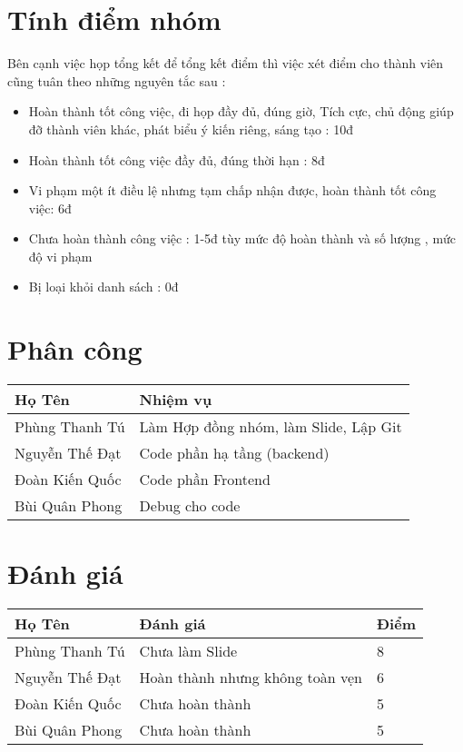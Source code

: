 \documentclass[12pt]{article}
\begin{document}
\begin{titlepage}
\section{Tính điểm nhóm}
Bên cạnh việc họp tổng kết để tổng kết điểm thì việc xét điểm cho thành viên cũng tuân theo những nguyên tắc sau :
\begin{itemize}
    \item Hoàn thành tốt công việc, đi họp đầy đủ, đúng giờ, Tích cực, chủ động giúp đỡ thành viên khác, phát biểu ý kiến riêng, sáng tạo : 10đ
    \item Hoàn thành tốt công việc đầy đủ, đúng thời hạn : 8đ
    \item Vi phạm một ít điều lệ nhưng tạm chấp nhận được, hoàn thành tốt công việc: 6đ
    \item Chưa hoàn thành công việc : 1-5đ tùy mức độ hoàn thành và số lượng , mức độ vi phạm
    \item Bị loại khỏi danh sách : 0đ
    
\end{itemize}

\section{Phân công}
\begin{tabular}{|l|l|} \hline
  Họ Tên   & Nhiệm vụ \\ \hline
    Phùng Thanh Tú  & Làm Hợp đồng nhóm, làm Slide, Lập Git\\ \hline
    Nguyễn Thế Đạt & Code phần hạ tầng (backend) \\ \hline
    Đoàn Kiến Quốc  & Code phần Frontend \\ \hline
    Bùi Quân Phong  & Debug cho code \\ \hline
\end{tabular}

\section{Đánh giá}
\begin{tabular}{|l|l|l|} \hline
  Họ Tên   & Đánh giá & Điểm \\ \hline
    Phùng Thanh Tú  & Chưa làm Slide & 8\\ \hline
    Nguyễn Thế Đạt & Hoàn thành nhưng không toàn vẹn & 6 \\ \hline
    Đoàn Kiến Quốc  & Chưa hoàn thành & 5\\ \hline
    Bùi Quân Phong  & Chưa hoàn thành & 5\\ \hline
\end{tabular}


 \end{titlepage}
\end{document}
